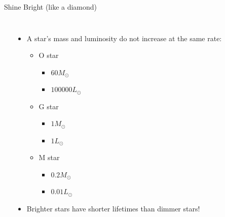 \documentclass[pdf, aspectratio=169]{beamer}
\begin{document}

\begin{frame}{Shine Bright \scriptsize(like a diamond)}
  \begin{columns}
	\begin{center}
	\end{center}
	\begin{itemize}
	  \item A star's mass and luminosity do not increase at the same rate:
		\begin{itemize}
		  \item O star
			\begin{itemize}
			  \item $60 M_\odot$
			  \item $100000 L_\odot$
			\end{itemize}
		  \item G star
			\begin{itemize}
			  \item $1 M_\odot$
			  \item $1 L_\odot$
			\end{itemize}
		  \item M star
			\begin{itemize}
			  \item $0.2 M_\odot$
			  \item $0.01 L_\odot$
			\end{itemize}
		\end{itemize}
	  \item Brighter stars have shorter lifetimes than dimmer stars!
	\end{itemize}
  \end{columns}
\end{frame}
\end{document}
